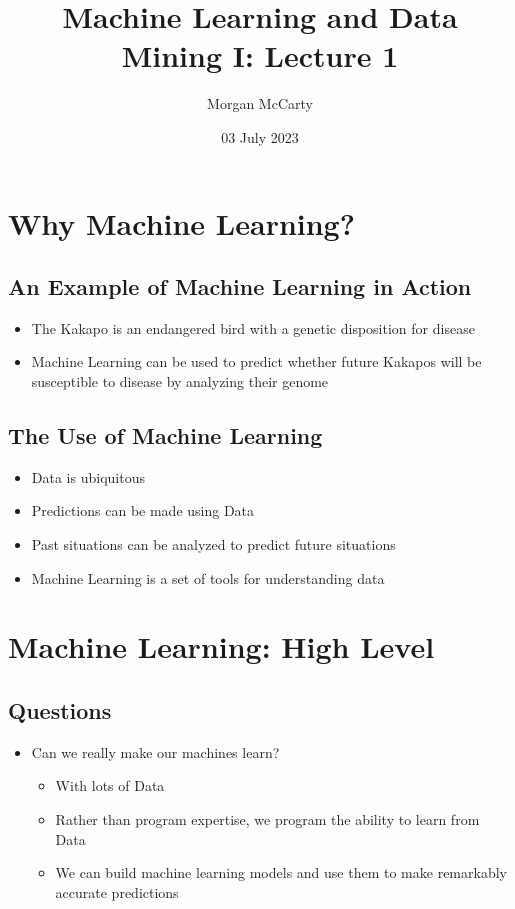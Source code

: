 \documentclass[12pt]{article}
\title{Machine Learning and Data Mining I: Lecture 1}
\author{Morgan McCarty}
\date{03 July 2023}
\begin{document}
    \maketitle

    \section{Why Machine Learning?}
        \subsection{An Example of Machine Learning in Action}
            \begin{itemize}
                \item The Kakapo is an endangered bird with a genetic disposition for disease
                \item Machine Learning can be used to predict whether future Kakapos will be susceptible to disease by analyzing their genome
            \end{itemize}
        \subsection{The Use of Machine Learning}
            \begin{itemize}
                \item Data is ubiquitous
                \item Predictions can be made using Data
                \item Past situations can be analyzed to predict future situations
                \item Machine Learning is a set of tools for understanding data
            \end{itemize}
    \section{Machine Learning: High Level}
        \subsection{Questions}
            \begin{itemize}
                \item Can we really make our machines learn?
                \begin{itemize}
                    \item With lots of Data
                    \item Rather than program expertise, we program the ability to learn from Data
                    \item We can build machine learning models and use them to make remarkably accurate predictions
                \end{itemize}
            \end{itemize}
\end{document}
